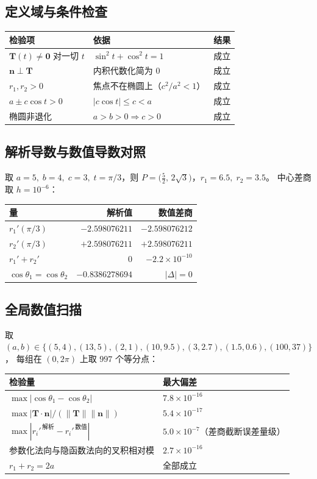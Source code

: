 \documentclass[11pt]{ctexart}
\begin{document}
\subsection{定义域与条件检查}
\begin{center}
\begin{tabular}{@{}lll@{}}
\toprule
检验项 & 依据 & 结果\\
\midrule
$\mathbf{T}(t)\neq\mathbf{0}$ 对一切 $t$ & $\sin^{2}t+\cos^{2}t=1$ & 成立\\
$\mathbf{n}\perp\mathbf{T}$ & 内积代数化简为 $0$ & 成立\\
$r_{1},r_{2}>0$ & 焦点不在椭圆上（$c^{2}/a^{2}<1$） & 成立\\
$a\pm c\cos t>0$ & $|c\cos t|\le c<a$ & 成立\\
椭圆非退化 & $a>b>0\Rightarrow c>0$ & 成立\\
\bottomrule
\end{tabular}
\end{center}

\subsection{解析导数与数值导数对照}
取 $a=5,\;b=4,\;c=3,\;t=\pi/3$，则 $P=\bigl(\tfrac{5}{2},\,2\sqrt{3}\bigr)$，$r_{1}=6.5,\;r_{2}=3.5$。
中心差商取 $h=10^{-6}$：

\begin{center}
\begin{tabular}{@{}lrr@{}}
\toprule
量 & 解析值 & 数值差商\\
\midrule
$r_{1}'(\pi/3)$ & $-2.598076211$ & $-2.598076212$\\
$r_{2}'(\pi/3)$ & $+2.598076211$ & $+2.598076211$\\
$r_{1}'+r_{2}'$ & $0$ & $-2.2\times10^{-10}$\\
$\cos\theta_{1}=\cos\theta_{2}$ & $-0.8386278694$ & $|\Delta|=0$\\
\bottomrule
\end{tabular}
\end{center}

\subsection{全局数值扫描}
取 $(a,b)\in\{(5,4),(13,5),(2,1),(10,9.5),(3,2.7),(1.5,0.6),(100,37)\}$，
每组在 $(0,2\pi)$ 上取 $997$ 个等分点：

\begin{center}
\begin{tabular}{@{}ll@{}}
\toprule
检验量 & 最大偏差\\
\midrule
$\max|\cos\theta_{1}-\cos\theta_{2}|$ & $7.8\times10^{-16}$\\
$\max|\mathbf{T}\cdot\mathbf{n}|/(\|\mathbf{T}\|\|\mathbf{n}\|)$ & $5.4\times10^{-17}$\\
$\max|r_{i}'^{\,\text{解析}}-r_{i}'^{\,\text{数值}}|$ & $5.0\times10^{-7}$（差商截断误差量级）\\
参数化法向与隐函数法向的叉积相对模 & $2.7\times10^{-16}$\\
$r_{1}+r_{2}=2a$ & 全部成立\\
\bottomrule
\end{tabular}
\end{center}
\end{document}
